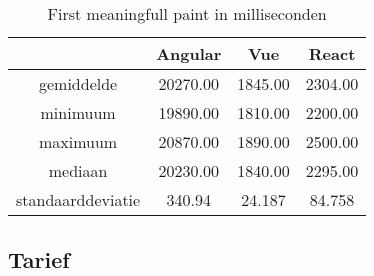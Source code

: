 \begin{table}[]
	\centering
	\caption{First meaningfull paint in milliseconden}
	\label{table:first_meaningfull_paint}
	\begin{tabular}{c|c|c|c|} \hline
									&Angular       &Vue        &React      \\ \hline
		gemiddelde			&20270.00     &1845.00  &2304.00 \\ \hline
		minimuum			&19890.00     &1810.00  &2200.00  \\ \hline
		maximuum			&20870.00    &1890.00  &2500.00 \\ \hline
		mediaan				   &20230.00    &1840.00  &2295.00 \\ \hline
		standaarddeviatie &340.94        &24.187    &84.758    \\ \hline
	\end{tabular}
\end{table}

\subsection{Tarief}
\label{sec:tarief}







